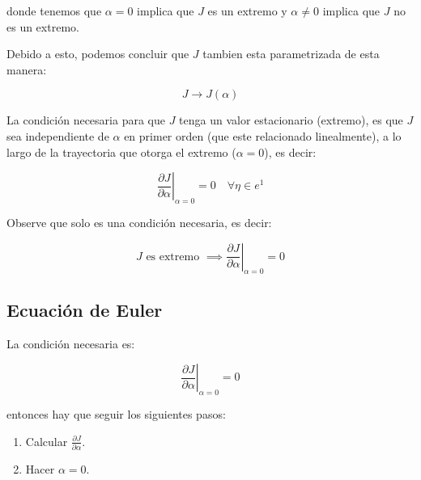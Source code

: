         donde tenemos que $\alpha = 0$ implica que $J$ es un extremo y $\alpha \ne 0$ implica que $J$ no es un extremo.

        Debido a esto, podemos concluir que $J$ tambien esta parametrizada de esta manera:

        \begin{equation*}
            J \to J(\alpha)
        \end{equation*}

        La condición necesaria para que $J$ tenga un valor estacionario (extremo), es que $J$ sea independiente de $\alpha$ en primer orden (que este relacionado linealmente), a lo largo de la trayectoria que otorga el extremo ($\alpha = 0$), es decir:

        \begin{equation}
            \left. \frac{\partial J}{\partial \alpha} \right|_{\alpha=0} = 0 \quad \forall \eta \in e^1
        \end{equation}

        \begin{nota}
            Observe que solo es una condición necesaria, es decir:

            \begin{equation*}
                J \text{ es extremo } \implies \left. \frac{\partial J}{\partial \alpha} \right|_{\alpha=0} = 0
            \end{equation*}
        \end{nota}

        \newpage
        \subsection{Ecuación de Euler}

            La condición necesaria es:

            \begin{equation*}
                \left. \frac{\partial J}{\partial \alpha} \right|_{\alpha=0} = 0
            \end{equation*}

            entonces hay que seguir los siguientes pasos:

            \begin{enumerate}
                \item Calcular $\frac{\partial J}{\partial \alpha}$.
                \item Hacer $\alpha = 0$.
            \end{enumerate}

